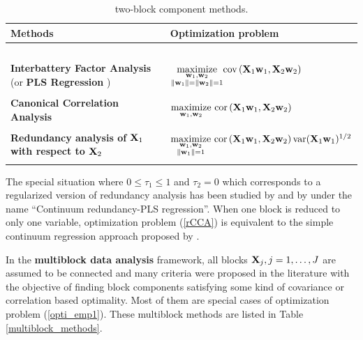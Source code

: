 \documentclass[
]{jss}
\begin{document}
\begin{table}[!ht]
\centering
\begin{tabular}{p{6.6cm}l}
\hline
\textbf{Methods} & Optimization problem \\
\hline
~\\
\textbf{Interbattery Factor Analysis} \citep{Tucker1958} (or \textbf{PLS Regression} \citep{Wold1983}) & $\underset{\substack{\mathbf{w}_1, \mathbf{w}_2\\ \Vert \mathbf{w}_1 \Vert =  \Vert \mathbf{w}_2 \Vert = 1}}{\text{maximize}} \text{cov}\left(\mathbf{X}_1\mathbf{w}_1, \mathbf{X}_2\mathbf{w}_2 \right)$ \\\\

\textbf{Canonical Correlation Analysis} \citep{Hotelling1936} & $\underset{\mathbf{w}_1, \mathbf{w}_2}{\text{maximize}} \text{ cor}\left(\mathbf{X}_1\mathbf{w}_1, \mathbf{X}_2\mathbf{w}_2 \right)$\\\\

\textbf{Redundancy analysis of $\mathbf{X}_1$ with respect to $\mathbf{X}_2$} \citep{Wollenberg1977} & 
$\underset{\substack{\mathbf{w}_1, \mathbf{w}_2\\ \Vert \mathbf{w}_1 \Vert = 1}}{\text{maximize}} \text{ cor}\left(\mathbf{X}_1\mathbf{w}_1, \mathbf{X}_2\mathbf{w}_2 \right)\text{var}(\mathbf{X}_1 \mathbf{w}_1)^{1/2}$\\\\
\hline
\end{tabular}
\caption{two-block component methods. 
\label{twoblock_methods}}
\end{table}

The special situation where \(0 \le \tau_1 \le 1\) and \(\tau_2 = 0\)
which corresponds to a regularized version of redundancy analysis has
been studied by \citep{Takane2007} and by \citep{Bougeard2008} under the
name ``Continuum redundancy-PLS regression''. When one block is reduced
to only one variable, optimization problem (\ref{rCCA}) is equivalent to
the simple continuum regression approach proposed by
\citep{Qannari2005}.

In the \textbf{multiblock data analysis} framework, all blocks
\(\mathbf{X}_j ,j = 1,\ldots,J\) are assumed to be connected and many criteria
were proposed in the literature with the objective of finding block
components satisfying some kind of covariance or correlation based
optimality. Most of them are special cases of optimization problem
(\ref{opti_emp1}). These multiblock methods are listed in Table
\ref{multiblock_methods}.
\end{document}

